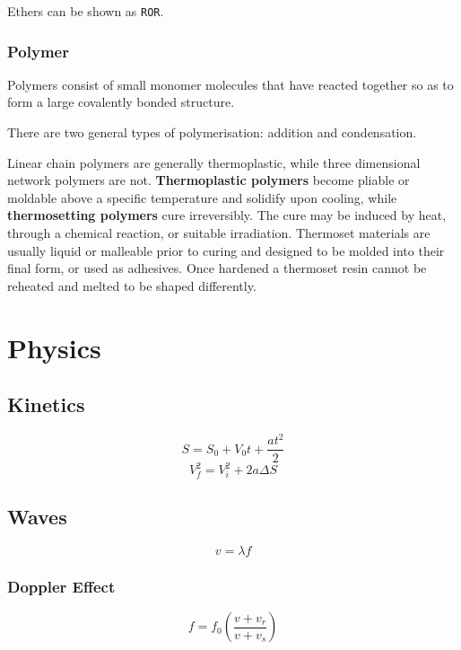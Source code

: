 \documentclass[oneside]{book} %
\theoremstyle{plain}
\begin{document}
Ethers can be shown as \texttt{ROR}.

\section{Polymer}
Polymers consist of small monomer molecules that have reacted together so as to
form a large covalently bonded structure.

There are two general types of polymerisation: addition and condensation.

Linear chain polymers are generally thermoplastic, while three dimensional
network polymers are not. \textbf{Thermoplastic polymers} become pliable or
moldable above a specific temperature and solidify upon cooling, while
\textbf{thermosetting polymers} cure irreversibly. The cure may be induced by
heat, through a chemical reaction, or suitable irradiation. Thermoset materials
are usually liquid or malleable prior to curing and designed to be molded into
their final form, or used as adhesives. Once hardened a thermoset resin cannot
be reheated and melted to be shaped differently.


\part{Physics}


\chapter{Kinetics}
\[S = S_0 + V_0 t + \frac{a t^2}{2}\]
\[V_f^2 = V_i^2 + 2 a \Delta S\]


\chapter{Waves}
\[v = \lambda f\]


\section{Doppler Effect}
\[f = f_0 \left ( \frac{v + v_r}{v + v_s} \right )\]
\end{document}
